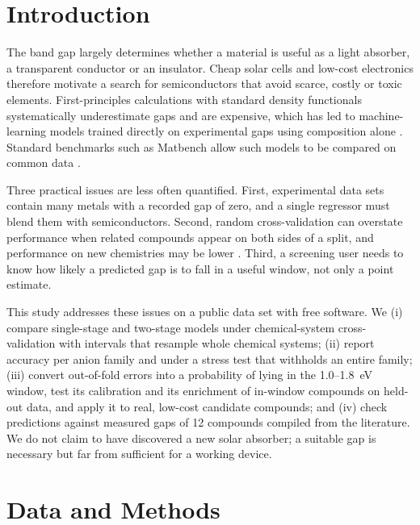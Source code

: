 \documentclass[11pt,a4paper]{article}
\begin{document}
\section{Introduction}
The band gap largely determines whether a material is useful as a light absorber, a transparent conductor or an insulator.
Cheap solar cells and low-cost electronics therefore motivate a search for semiconductors that avoid scarce, costly or toxic elements. First-principles calculations
with standard density functionals systematically underestimate gaps and are expensive, which has led to machine-learning models trained directly on experimental
gaps using composition alone \cite{Zhuo2018,Ward2016}. Standard benchmarks such as Matbench allow such models to be compared on common data \cite{Dunn2020}.

Three practical issues are less often quantified. First, experimental data sets contain many metals with a recorded gap of zero, and a single regressor must blend them with semiconductors.
Second, random cross-validation can overstate performance when related compounds appear on both sides of a split, and performance on new chemistries may be lower \cite{Meredig2018}.
Third, a screening user needs to know how likely a predicted gap is to fall in a useful window, not only a point estimate.

This study addresses these issues on a public data set with free software. We (i) compare single-stage and two-stage models under chemical-system cross-validation with intervals that resample whole chemical systems;
(ii) report accuracy per anion family and under a stress test that withholds an entire family; (iii) convert out-of-fold errors into a probability of lying in the 1.0--1.8~eV window, test its calibration and its enrichment of in-window compounds on held-out data, and apply it to real,
low-cost candidate compounds; and (iv) check predictions against measured gaps of 12 compounds compiled from the literature. We do not claim to have discovered a new solar absorber; a suitable gap is necessary but far from sufficient for a working device.

\section{Data and Methods}
\end{document}
